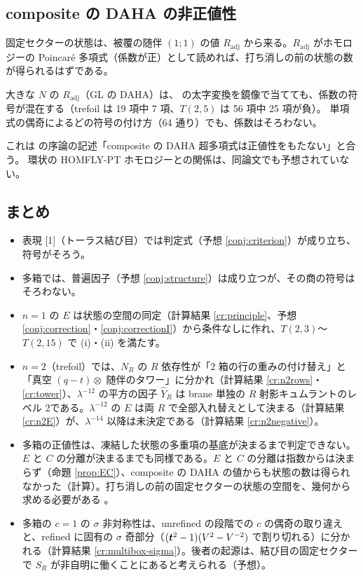 \subsection{composite の DAHA の非正値性}\label{sec:composite}
固定セクターの状態は、被覆の随伴 $(1;1)$ の値 $R_{\mathrm{adj}}$ から来る。$R_{\mathrm{adj}}$ がホモロジーの Poincaré 多項式（係数が正）として読めれば、打ち消しの前の状態の数が得られるはずである。
\begin{compresult}
大きな $N$ の $R_{\mathrm{adj}}$（GL の DAHA）は、\cite{KN17} の太字変換を鏡像で当てても、係数の符号が混在する（trefoil は 19 項中 7 項、$T(2,5)$ は 56 項中 25 項が負）。
単項式の偶奇によるどの符号の付け方（64 通り）でも、係数はそろわない。
\end{compresult}
これは \cite{CE15} の序論の記述「composite の DAHA 超多項式は正値性をもたない」と合う。
環状の HOMFLY-PT ホモロジーとの関係は、同論文でも予想されていない。

\subsection{まとめ}
\begin{itemize}
\item 表現 [1]（トーラス結び目）では判定式（予想 \ref{conj:criterion}）が成り立ち、符号がそろう。
\item 多箱では、普遍因子（予想 \ref{conj:structure}）は成り立つが、その商の符号はそろわない。
\item $n = 1$ の $E$ は状態の空間の同定（計算結果 \ref{cr:principle}、予想 \ref{conj:correction}・\ref{conj:correctionI}）から条件なしに作れ、$T(2,3)$〜$T(2,15)$ で (i)・(ii) を満たす。
\item $n = 2$（trefoil）では、$N_R$ の $R$ 依存性が「2 箱の行の重みの付け替え」と「真空 $(q-t)\otimes$ 随伴のタワー」に分かれ（計算結果 \ref{cr:n2rows}・\ref{cr:tower}）、$\lambda^{-12}$ の平方の因子 $\hat Y_R$ は brane 単独の $R$ 射影キュムラントのレベル 2である。$\lambda^{-12}$ の $E$ は両 $R$ で全部入れ替えとして決まる（計算結果 \ref{cr:n2E}）が、$\lambda^{-14}$ 以降は未決定である（計算結果 \ref{cr:n2negative}）。
\item 多箱の正値性は、凍結した状態の多重項の基底が決まるまで判定できない。$E$ と $C$ の分離が決まるまでも同様である。$E$ と $C$ の分離は指数からは決まらず（命題 \ref{prop:EC}）、composite の DAHA の値からも状態の数は得られなかった（計算）。打ち消しの前の固定セクターの状態の空間を、幾何から求める必要がある \open。
\item 多箱の $c = 1$ の $\sigma$ 非対称性は、unrefined の段階での $c$ の偶奇の取り違えと、refined に固有の $\sigma$ 奇部分（$(\bm{t}^2-1)(V^2-V^{-2})$ で割り切れる）に分かれる（計算結果 \ref{cr:multibox-sigma}）。後者の起源は、結び目の固定セクターで $S_R$ が非自明に働くことにあると考えられる（予想）。
\end{itemize}
